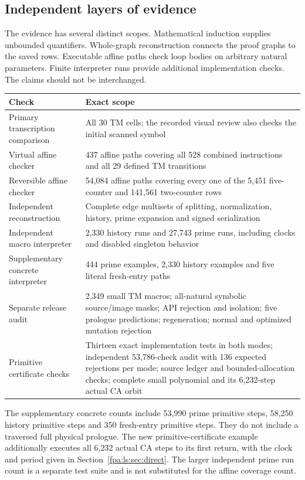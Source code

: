 \documentclass[11pt,a4paper]{article}
\numberwithin{equation}{section}
\begin{document}
\subsection{Independent layers of evidence}
The evidence has several distinct scopes. Mathematical induction supplies
unbounded quantifiers. Whole-graph reconstruction connects the proof graphs
to the saved rows. Executable affine paths check loop bodies on arbitrary
natural parameters. Finite interpreter runs provide additional implementation
checks. The claims should not be interchanged.
\begin{center}
\begin{tabular}{p{.43\linewidth}p{.47\linewidth}}\toprule
Check & Exact scope\\\midrule
Primary transcription comparison & All 30 TM cells; the recorded visual
review also checks the initial scanned symbol\\[3pt]
Virtual affine checker & 437 affine paths covering all 528 combined
instructions and all 29 defined TM transitions\\[3pt]
Reversible affine checker & 54,084 affine paths covering every one of the
5,451 five-counter and 141,561 two-counter rows\\[3pt]
Independent reconstruction & Complete edge multisets of splitting,
normalization, history, prime expansion and signed serialization\\[3pt]
Independent macro interpreter & 2,330 history runs and 27,743 prime runs,
including clocks and disabled singleton behavior\\[3pt]
Supplementary concrete interpreter & 444 prime examples, 2,330 history
examples and five literal fresh-entry paths\\[3pt]
Separate release audit & 2,349 small TM macros; all-natural symbolic
source/image masks; API rejection and isolation; five prologue predictions;
regeneration; normal and optimized mutation rejection\\[3pt]
Primitive certificate checks & Thirteen exact implementation tests in both
modes; independent 53,786-check audit with 136 expected rejections per
mode; source ledger and bounded-allocation checks; complete small polynomial
and its 6,232-step actual CA orbit\\\bottomrule
\end{tabular}
\end{center}
The supplementary concrete counts include 53,990 prime primitive steps,
58,250 history primitive steps and 350 fresh-entry primitive steps. They do
not include a traversed full physical prologue. The new primitive-certificate example additionally executes all 6,232 actual
CA steps to its first return, with the clock and period given in
Section~\ref{fpa:ls:sec:direct}. The larger independent prime
run count is a separate test suite and is not substituted for the affine
coverage count.
\end{document}
